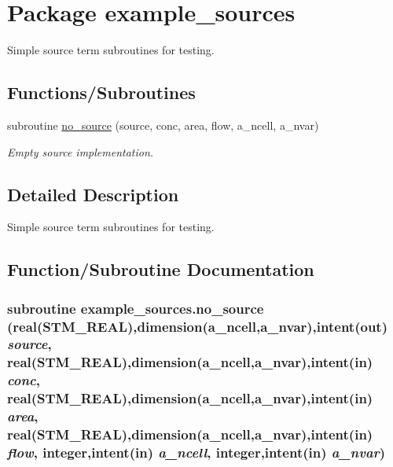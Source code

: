 \hypertarget{a00031}{
\section{Package example\_\-sources}
\label{a00031}
}
Simple source term subroutines for testing.  


\subsection*{Functions/Subroutines}
\begin{CompactItemize}
\item 
subroutine \hyperlink{a00031_f63e4b0f5e307047da9a26a14e3be866}{no\_\-source} (source, conc, area, flow, a\_\-ncell, a\_\-nvar)
\begin{CompactList}\small\item\em Empty source implementation. \item\end{CompactList}\end{CompactItemize}


\subsection{Detailed Description}
Simple source term subroutines for testing. 



\subsection{Function/Subroutine Documentation}
\hypertarget{a00031_f63e4b0f5e307047da9a26a14e3be866}{
\subsubsection[{no\_\-source}]{\setlength{\rightskip}{0pt plus 5cm}subroutine example\_\-sources.no\_\-source (real(STM\_\-REAL),dimension(a\_\-ncell,a\_\-nvar),intent(out) {\em source}, \/  real(STM\_\-REAL),dimension(a\_\-ncell,a\_\-nvar),intent(in) {\em conc}, \/  real(STM\_\-REAL),dimension(a\_\-ncell,a\_\-nvar),intent(in) {\em area}, \/  real(STM\_\-REAL),dimension(a\_\-ncell,a\_\-nvar),intent(in) {\em flow}, \/  integer,intent(in) {\em a\_\-ncell}, \/  integer,intent(in) {\em a\_\-nvar})}}
\label{a00031_f63e4b0f5e307047da9a26a14e3be866}


